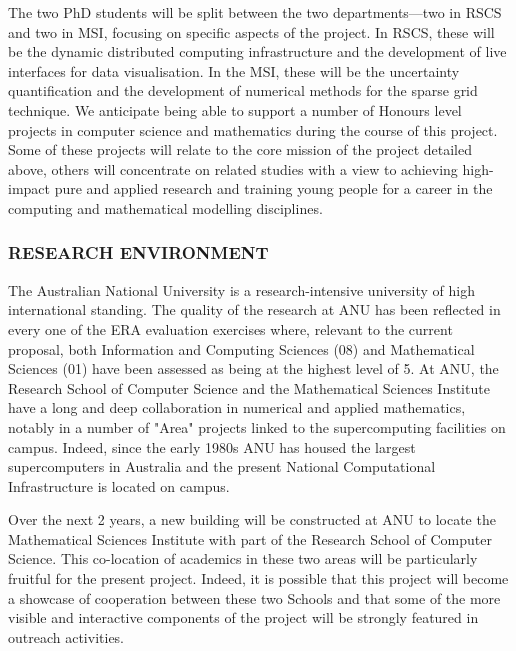 \documentclass[a4paper,fontsize=12pt]{scrartcl}
\begin{document}
The two  PhD students will be split between the two departments---two
in RSCS and two in MSI, focusing on specific aspects of the project.
In RSCS, these will be the dynamic distributed computing
infrastructure and the development of live interfaces for data
visualisation. In the MSI, these will be the uncertainty
quantification and the development of numerical methods for the sparse
grid technique. We anticipate being able to support a number of Honours level projects in computer science and mathematics during the course of this project. Some of these projects will relate to the core mission of the project detailed above, others will concentrate on related studies with a view to achieving high-impact pure and applied research and training young people for a career in the computing and mathematical modelling disciplines.

\subsubsection*{RESEARCH ENVIRONMENT}

The Australian National University is a research-intensive university of high international standing. The quality of the research at ANU has been reflected in every one of the ERA evaluation exercises where, relevant to the current proposal, both Information and Computing Sciences (08) and Mathematical Sciences (01) have been assessed as being at the highest level of 5. At ANU, the Research School of Computer Science and the Mathematical Sciences Institute have a long and deep collaboration in numerical and applied mathematics, notably in a number of "Area" projects linked to the supercomputing facilities on campus. Indeed, since the early 1980s ANU has housed the largest supercomputers in Australia and the present National Computational Infrastructure is located on campus. 

Over the next 2 years, a new building will be constructed at ANU to locate the Mathematical Sciences Institute with part of the Research School of Computer Science. This co-location of academics in these two areas will be particularly fruitful for the present project. Indeed, it is possible that this project will become a showcase of cooperation between these two Schools and that some of the more visible and interactive components of the project will be strongly featured in outreach activities. 
\end{document}
